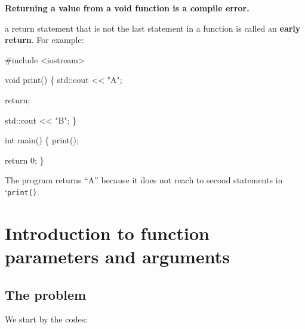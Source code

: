 \documentclass[
  letterpaper,
  DIV=11,
  numbers=noendperiod]{scrreprt}
\newenvironment{Shaded}{\begin{snugshade}}{\end{snugshade}}
\newcommand{\CommentTok}[1]{\textcolor[rgb]{0.37,0.37,0.37}{#1}}
\newcommand{\DecValTok}[1]{\textcolor[rgb]{0.68,0.00,0.00}{#1}}
\newcommand{\ErrorTok}[1]{\textcolor[rgb]{0.68,0.00,0.00}{#1}}
\newcommand{\FunctionTok}[1]{\textcolor[rgb]{0.28,0.35,0.67}{#1}}
\newcommand{\NormalTok}[1]{\textcolor[rgb]{0.00,0.23,0.31}{#1}}
\newcommand{\SpecialCharTok}[1]{\textcolor[rgb]{0.37,0.37,0.37}{#1}}
\newcommand{\StringTok}[1]{\textcolor[rgb]{0.13,0.47,0.30}{#1}}
\providecommand{\tightlist}{%
  \setlength{\itemsep}{0pt}\setlength{\parskip}{0pt}}\usepackage{longtable,booktabs,array}
\begin{document}
\textbf{Returning a value from a void function is a compile error.}

\begin{description}
\tightlist
\item[Early return]
a return statement that is not the last statement in a function is
called an \textbf{early return}. For example:
\end{description}

\begin{Shaded}
\begin{Highlighting}[]
\CommentTok{\#include \textless{}iostream\textgreater{}}

\NormalTok{void }\FunctionTok{print}\NormalTok{()}
\NormalTok{\{}
\NormalTok{    std}\SpecialCharTok{::}\NormalTok{cout }\SpecialCharTok{\textless{}}\ErrorTok{\textless{}} \StringTok{"A"}\NormalTok{;}

\NormalTok{    return;}

\NormalTok{    std}\SpecialCharTok{::}\NormalTok{cout }\SpecialCharTok{\textless{}}\ErrorTok{\textless{}} \StringTok{"B"}\NormalTok{;}
\NormalTok{\}}

\NormalTok{int }\FunctionTok{main}\NormalTok{()}
\NormalTok{\{}
    \FunctionTok{print}\NormalTok{();}

\NormalTok{    return }\DecValTok{0}\NormalTok{;}
\NormalTok{\}}
\end{Highlighting}
\end{Shaded}

The program returns ``A'' because it does not reach to second statements
in `\texttt{print()}.

\hypertarget{introduction-to-function-parameters-and-arguments}{%
\section{Introduction to function parameters and
arguments}\label{introduction-to-function-parameters-and-arguments}}

\hypertarget{the-problem}{%
\subsection{The problem}\label{the-problem}}

We start by the codes:
\end{document}
